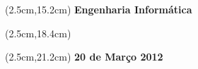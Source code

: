 \begin{titlepage}
   \textblockorigin{0cm}{5cm}
   \begin{textblock*}{16cm}(2.5cm,15.2cm)
     \centering
       \textbf{\large Engenharia Informática}
   \end{textblock*}

   \textblockorigin{0cm}{5cm}
   \begin{textblock*}{16cm}(2.5cm,18.4cm)
     \centering
       \textbf{\large}
   \end{textblock*}

   \textblockorigin{0cm}{5cm}
   \begin{textblock*}{16cm}(2.5cm,21.2cm)
     \centering
       \textbf{20 de Março 2012}
   \end{textblock*}
   
\end{titlepage}
